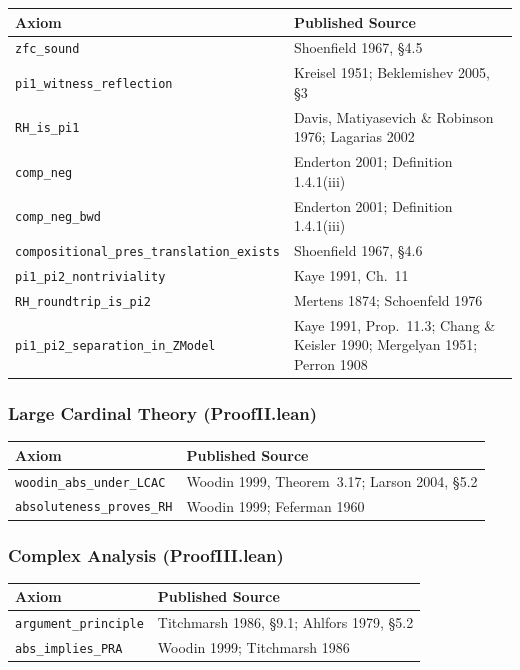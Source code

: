 \begin{center}
\begin{tabular}{lp{9cm}}
\toprule
\textbf{Axiom} & \textbf{Published Source} \\
\midrule
\texttt{zfc\_sound} & Shoenfield 1967, \S4.5 \\
\texttt{pi1\_witness\_reflection} & Kreisel 1951; Beklemishev 2005, \S3 \\
\texttt{RH\_is\_pi1} & Davis, Matiyasevich \& Robinson 1976; Lagarias 2002 \\
\texttt{comp\_neg} & Enderton 2001; Definition 1.4.1(iii) \\
\texttt{comp\_neg\_bwd} & Enderton 2001; Definition 1.4.1(iii) \\
\texttt{compositional\_pres\_translation\_exists} & Shoenfield 1967, \S4.6 \\
\texttt{pi1\_pi2\_nontriviality} & Kaye 1991, Ch.~11 \\
\texttt{RH\_roundtrip\_is\_pi2} & Mertens 1874; Schoenfeld 1976 \\
\texttt{pi1\_pi2\_separation\_in\_ZModel} & Kaye 1991, Prop.~11.3; Chang \& Keisler 1990; Mergelyan 1951; Perron 1908 \\
\bottomrule
\end{tabular}
\end{center}

\subsubsection*{Large Cardinal Theory (ProofII.lean)}

\begin{center}
\begin{tabular}{lp{9cm}}
\toprule
\textbf{Axiom} & \textbf{Published Source} \\
\midrule
\texttt{woodin\_abs\_under\_LCAC} & Woodin 1999, Theorem~3.17; Larson 2004, \S5.2 \\
\texttt{absoluteness\_proves\_RH} & Woodin 1999; Feferman 1960 \\
\bottomrule
\end{tabular}
\end{center}

\subsubsection*{Complex Analysis (ProofIII.lean)}

\begin{center}
\begin{tabular}{lp{9cm}}
\toprule
\textbf{Axiom} & \textbf{Published Source} \\
\midrule
\texttt{argument\_principle} & Titchmarsh 1986, \S9.1; Ahlfors 1979, \S5.2 \\
\texttt{abs\_implies\_PRA} & Woodin 1999; Titchmarsh 1986 \\
\bottomrule
\end{tabular}
\end{center}

